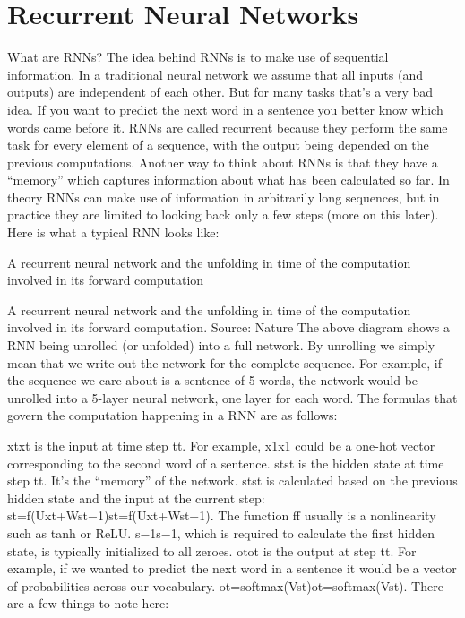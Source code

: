 \section{Recurrent Neural Networks}

What are RNNs?
The idea behind RNNs is to make use of sequential information. In a traditional neural network we assume that all inputs (and outputs) are independent of each other. But for many tasks that’s a very bad idea. If you want to predict the next word in a sentence you better know which words came before it. RNNs are called recurrent because they perform the same task for every element of a sequence, with the output being depended on the previous computations. Another way to think about RNNs is that they have a “memory” which captures information about what has been calculated so far. In theory RNNs can make use of information in arbitrarily long sequences, but in practice they are limited to looking back only a few steps (more on this later). Here is what a typical RNN looks like:



A recurrent neural network and the unfolding in time of the computation involved in its forward computation

A recurrent neural network and the unfolding in time of the computation involved in its forward computation. Source: Nature The above diagram shows a RNN being unrolled (or unfolded) into a full network. By unrolling we simply mean that we write out the network for the complete sequence. For example, if the sequence we care about is a sentence of 5 words, the network would be unrolled into a 5-layer neural network, one layer for each word. The formulas that govern the computation happening in a RNN are as follows:

xtxt is the input at time step tt. For example, x1x1 could be a one-hot vector corresponding to the second word of a sentence.
stst is the hidden state at time step tt. It’s the “memory” of the network. stst is calculated based on the previous hidden state and the input at the current step: st=f(Uxt+Wst−1)st=f(Uxt+Wst−1). The function ff usually is a nonlinearity such as tanh or ReLU. s−1s−1, which is required to calculate the first hidden state, is typically initialized to all zeroes.
otot is the output at step tt. For example, if we wanted to predict the next word in a sentence it would be a vector of probabilities across our vocabulary. ot=softmax(Vst)ot=softmax(Vst).
There are a few things to note here:

